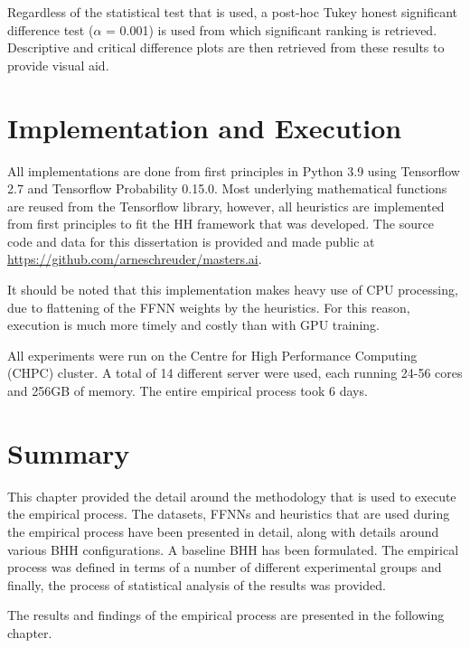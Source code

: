 Regardless of the statistical test that is used, a post-hoc Tukey honest significant difference test ($\alpha$ = 0.001) is used from which significant ranking is retrieved. Descriptive and critical difference plots are then retrieved from these results to provide visual aid.

\section{Implementation and Execution}\label{sec:methodology:implementation}

All implementations are done from first principles in Python 3.9 using Tensorflow 2.7 and Tensorflow Probability 0.15.0. Most underlying mathematical functions are reused from the Tensorflow library, however, all heuristics are implemented from first principles to fit the \acs{HH} framework that was developed. The source code and data for this dissertation is provided and made public at \url{https://github.com/arneschreuder/masters.ai}.

It should be noted that this implementation makes heavy use of CPU processing, due to flattening of the \acs{FFNN} weights by the heuristics. For this reason, execution is much more timely and costly than with GPU training.

All experiments were run on the Centre for High Performance Computing (CHPC) cluster. A total of 14 different server were used, each running 24-56 cores and 256GB of memory. The entire empirical process took 6 days.

\section{Summary}\label{sec:methodology:summary}

This chapter provided the detail around the methodology that is used to execute the empirical process. The datasets, \acp{FFNN} and heuristics that are used during the empirical process have been presented in detail, along with details around various \acs{BHH} configurations. A baseline \acs{BHH} has been formulated. The empirical process was defined in terms of a number of different experimental groups and finally, the process of statistical analysis of the results was provided.

The results and findings of the empirical process are presented in the following chapter.
